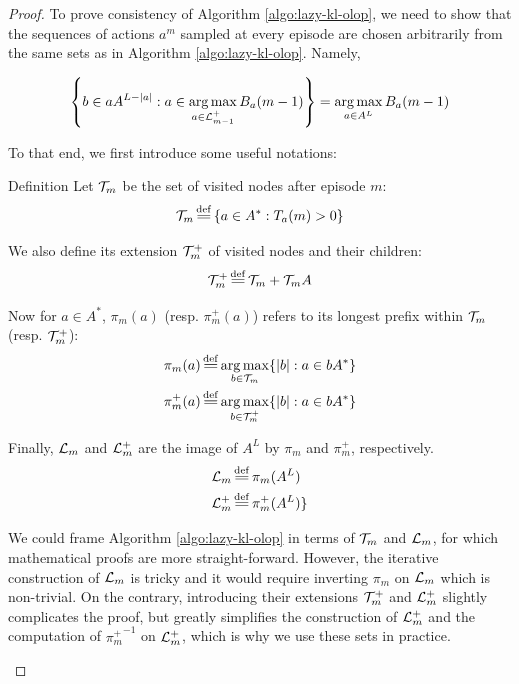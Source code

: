 \documentclass[runningheads]{llncs}
\begin{document}
\begin{proof}

To prove consistency of Algorithm \ref{algo:lazy-kl-olop}, we need to show that the sequences of actions $a^m$ sampled at every episode are chosen arbitrarily from the same sets as in Algorithm \ref{algo:lazy-kl-olop}.
Namely, 

\begin{equation*}
    \left\{ b\in a A^{L-|a|} : a \in \operatorname*{arg\,max}_{a\in \mathcal{L}_{m-1}^+} B_a(m-1)\right\} = \operatorname*{arg\,max}_{a\in A^L} B_a(m-1)
\end{equation*}

To that end, we first introduce some useful notations:

\begin{paragraph}{Definition}
Let $\mathcal{T}_m$ be the set of visited nodes after episode $m$:
\begin{equation*}
    \Tau_m \eqdef \left\{a\in A^*: T_a(m) > 0\right\}
\end{equation*}

We also define its extension $\mathcal{T}_m^+$ of visited nodes and their children:
\begin{equation*}
    \Tau_m^+ \eqdef \Tau_m + \Tau_m A
\end{equation*}

Now for $a\in A^*$, $\pi_m(a)$ (resp. $\pi_m^+(a)$) refers to its longest prefix within $\mathcal{T}_m$ (resp. $\mathcal{T}_m^+$):
\begin{align*}
    \pi_m(a) &\eqdef \argmax_{b\in\Tau_m} \{|b|: a\in b A^* \} \\
    \pi_m^+(a) &\eqdef \argmax_{b\in\Tau_m^+} \{|b|: a\in b A^* \}
\end{align*}

Finally, $\mathcal{L}_m$ and $\mathcal{L}_m^+$ are the image of $A^L$ by $\pi_m$ and $\pi_m^+$, respectively.
\begin{align*}
    \LL_m &\eqdef \pi_m(A^L) \\
    \LL_m^+ &\eqdef \pi_m^+(A^L) \}
\end{align*}
\end{paragraph}

\begin{remark}
We could frame Algorithm \ref{algo:lazy-kl-olop} in terms of $\mathcal{T}_m$ and $\mathcal{L}_m$, for which mathematical proofs are more straight-forward. However, the iterative construction of $\mathcal{L}_m$ is tricky and it would require inverting $\pi_m$ on $\mathcal{L}_m$ which is non-trivial. On the contrary, introducing their extensions  $\mathcal{T}_m^+$ and $\mathcal{L}_m^+$ slightly complicates the proof, but greatly simplifies the construction of $\mathcal{L}_m^+$ and the computation of ${\pi_m^+}^{-1}$ on $\mathcal{L}_m^+$, which is why we use these sets in practice.
\end{remark}


\end{proof}
\end{document}
